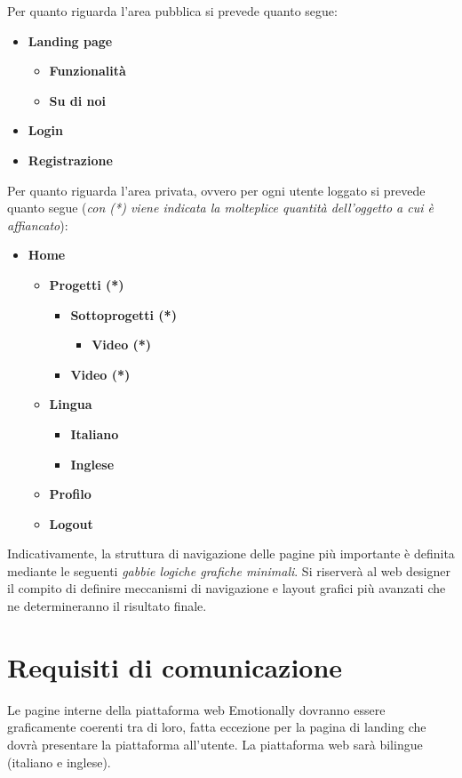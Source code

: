 Per quanto riguarda l'area pubblica si prevede quanto segue:
\begin{itemize}
	\item \textbf{Landing page}
	\begin{itemize}
		\item \textbf{Funzionalità}
		\item \textbf{Su di noi}
	\end{itemize}
\item \textbf{Login}
\item \textbf{Registrazione}
\end{itemize}
Per quanto riguarda l'area privata, ovvero per ogni utente loggato si prevede 
quanto segue (\textit{con (*) viene indicata la molteplice quantità 
dell'oggetto a cui è affiancato}): 
\begin{itemize}
	\item \textbf{Home}
	\begin{itemize}
		\item \textbf{Progetti (*)} 
		\begin{itemize}
			\item \textbf{Sottoprogetti (*)}
			\begin{itemize}
				\item \textbf{Video (*)}
			\end{itemize}
		\item \textbf{Video (*)}
		\end{itemize}
	\item \textbf{Lingua}
	\begin{itemize}
		\item \textbf{Italiano}
		\item \textbf{Inglese}
	\end{itemize}
\item \textbf{Profilo}
\item \textbf{Logout}
	\end{itemize}
\end{itemize}
Indicativamente, la struttura di navigazione delle pagine più importante è 
definita mediante le seguenti \textit{gabbie logiche grafiche minimali}. Si 
riserverà al web designer il compito di definire meccanismi di navigazione e 
layout grafici più avanzati che ne determineranno il risultato finale.



\section{Requisiti di comunicazione}\label{sec:requisiti-di-comunicazione}
Le pagine interne della piattaforma web Emotionally dovranno essere 
graficamente coerenti tra di loro, fatta eccezione per la pagina di landing che 
dovrà presentare la piattaforma all'utente. La piattaforma web sarà bilingue 
(italiano e inglese).

